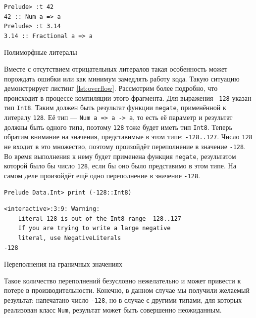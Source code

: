 \begin{ListingEnv}[H]
\begin{lstlisting}
Prelude> :t 42
42 :: Num a => a
Prelude> :t 3.14
3.14 :: Fractional a => a
\end{lstlisting}
\caption{Полиморфные литералы}
\label{lst:types}
\end{ListingEnv}

Вместе с отсутствием отрицательных литералов такая особенность может порождать
ошибки или как минимум замедлять работу кода. Такую ситуацию демонстрирует
листинг \ref{lst:overflow}. Рассмотрим более подробно, что происходит в
процессе компиляции этого фрагмента. Для выражения \texttt{-128} указан тип
\texttt{Int8}. Таким должен быть результат функции \texttt{negate}, применённой
к литералу \texttt{128}. Её тип --- \texttt{Num a => a -> a}, то есть её
параметр и результат должны быть одного типа, поэтому \texttt{128} тоже будет
иметь тип \texttt{Int8}. Теперь обратим внимание на значения, представимые в
этом типе: \texttt{-128..127}. Число \texttt{128} не входит в это множество,
поэтому произойдёт переполнение в значение \texttt{-128}.  Во время выполнения
к нему будет применена функция \texttt{negate}, результатом которой было бы
число \texttt{128}, если бы оно было представимо в этом типе.  На самом деле
произойдёт ещё одно переполнение в значение \texttt{-128}.

\begin{ListingEnv}[H]
\begin{lstlisting}
Prelude Data.Int> print (-128::Int8)
\end{lstlisting}
\begin{verbatim}
<interactive>:3:9: Warning:
    Literal 128 is out of the Int8 range -128..127
    If you are trying to write a large negative
    literal, use NegativeLiterals
-128
\end{verbatim}
\caption{Переполнения на граничных значениях}
\label{lst:overflow}
\end{ListingEnv}

Такое количество переполнений безусловно нежелательно и может привести к потере
в производительности. Конечно, в данном случае мы получили желаемый результат:
напечатано число \texttt{-128}, но в случае с другими типами, для которых
реализован класс \texttt{Num}, результат может быть совершенно неожиданным.
